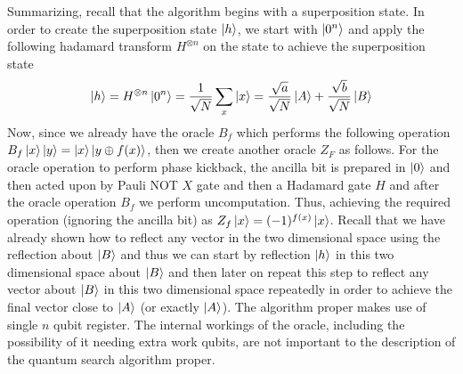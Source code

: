 Summarizing, recall that the algorithm begins with a superposition state. In order to create the superposition state $\ket{h}$, we start with $\ket{0^n}$ and apply the following hadamard transform $H^{\otimes n}$ on the state to achieve the superposition state 
\[
\ket{h}=H^{\otimes n}\ket{0^n}=\frac{1}{\sqrt{N}}\sum_{x} \ket{x}=\frac{\sqrt{a}}{\sqrt{N}}\ket{A} + \frac{\sqrt{b}}{\sqrt{N}}\ket{B}
\]
Now, since we already have the oracle $B_f$ which performs the following operation $B_f\ket{x}\ket{y} = \ket{x}\ket{y\oplus f(x)}$, then we create another oracle $Z_F$ as follows. 
For the oracle operation to perform phase kickback, the ancilla bit is prepared in $\ket{0}$ and then acted upon by Pauli NOT $X$ gate and then a Hadamard gate $H$ and after the oracle operation $B_f$ we perform uncomputation. Thus, achieving the required operation (ignoring the ancilla bit) as $Z_f\ket{x}=(-1)^{f(x)}\ket{x}$. Recall that we have already shown how to reflect any vector in the two dimensional space using the reflection about $\ket{B}$ and thus we can start by reflection $\ket{h}$ in this two dimensional space about $\ket{B}$ and then later on repeat this step to reflect any vector about $\ket{B}$ in this two dimensional space repeatedly in order to achieve the final vector close to $\ket{A}$ (or exactly $\ket{A}$). The algorithm proper makes use of single $n$ qubit register. The internal workings of the oracle, including the possibility of it needing extra work qubits, are not important to the description of the quantum search algorithm proper.

